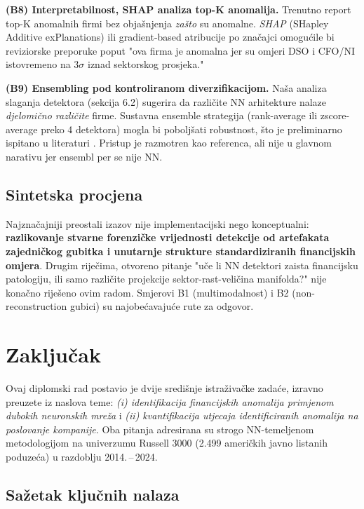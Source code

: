 \documentclass[diplomskirad,authoryear]{fer}
\begin{document}
\textbf{(B8) Interpretabilnost, SHAP analiza top-K anomalija.} Trenutno report top-K anomalnih firmi bez objašnjenja \emph{zašto} su anomalne. \emph{SHAP} (SHapley Additive exPlanations) ili gradient-based atribucije po značajci omogućile bi reviziorske preporuke poput "ova firma je anomalna jer su omjeri DSO i CFO/NI istovremeno na 3$\sigma$ iznad sektorskog prosjeka."

\textbf{(B9) Ensembling pod kontroliranom diverzifikacijom.} Naša analiza slaganja detektora (sekcija 6.2) sugerira da različite NN arhitekture nalaze \emph{djelomično različite} firme. Sustavna ensemble strategija (rank-average ili zscore-average preko 4 detektora) mogla bi poboljšati robustnost, što je preliminarno ispitano u literaturi \citep{aggarwal2017}. Pristup je razmotren kao referenca, ali nije u glavnom narativu jer ensembl per se nije NN.

\section{Sintetska procjena}

Najznačajniji preostali izazov nije implementacijski nego konceptualni: \textbf{razlikovanje stvarne forenzičke vrijednosti detekcije od artefakata zajedničkog gubitka i unutarnje strukture standardiziranih financijskih omjera}. Drugim riječima, otvoreno pitanje "uče li NN detektori zaista financijsku patologiju, ili samo različite projekcije sektor-rast-veličina manifolda?" nije konačno riješeno ovim radom. Smjerovi B1 (multimodalnost) i B2 (non-reconstruction gubici) su najobećavajuće rute za odgovor.

\chapter{Zaključak}

Ovaj diplomski rad postavio je dvije središnje istraživačke zadaće, izravno preuzete iz naslova teme: \emph{(i) identifikacija financijskih anomalija primjenom dubokih neuronskih mreža} i \emph{(ii) kvantifikacija utjecaja identificiranih anomalija na poslovanje kompanije}. Oba pitanja adresirana su strogo NN-temeljenom metodologijom na univerzumu Russell 3000 (2.499 američkih javno listanih poduzeća) u razdoblju 2014.\,--\,2024.

\section{Sažetak ključnih nalaza}
\end{document}
